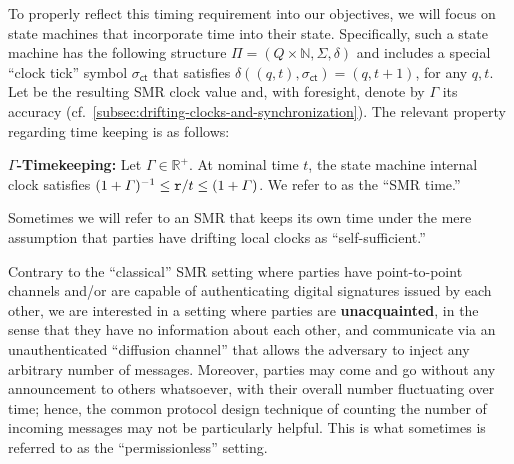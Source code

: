 To properly reflect this timing requirement into our objectives, we will focus on state machines that incorporate time into their state.
%
Specifically, such a state machine has the following structure $\Pi = (Q \times \mathbb{N}, \Sigma, \delta)$ and includes a special ``clock tick'' symbol $\sigma_\mathsf{ct}$ that satisfies $\delta((q,t), \sigma_\mathsf{ct})= (q,t + 1)$, for any $q, t$.
%
Let \round be the resulting SMR clock value and, with foresight, denote by $\varGamma$ its accuracy (cf.~\cref{subsec:drifting-clocks-and-synchronization}).
%
The relevant property regarding time keeping is as follows:
%
\begin{cccItemize}[noitemsep]
    \item \textbf{$\varGamma$-Timekeeping:}
    Let $\varGamma \in \mathbb{R}^+$.
    At nominal time $t$, the state machine internal clock \round satisfies $(1+ \varGamma)^{-1} \leq  \mathtt{r} / t \leq (1+\varGamma) $.
    We refer to \round as the ``SMR time.''
\end{cccItemize}
%
Sometimes we will refer to an SMR that keeps its own time under the mere assumption that parties have drifting local clocks as ``self-sufficient.''

Contrary to the ``classical'' SMR setting where parties have point-to-point channels and/or are capable of authenticating digital signatures issued by each other, we are interested in a setting where parties are \textbf{unacquainted}, in the sense that they have no information about each other, and communicate via an unauthenticated ``diffusion channel'' that allows the adversary to inject any arbitrary number of messages.
%
Moreover, parties may come and go without any announcement to others whatsoever, with their overall number fluctuating over time; hence, the common protocol design technique of counting the number of incoming messages may not be particularly helpful.
%
This is what sometimes is referred to as the ``permissionless'' setting.


